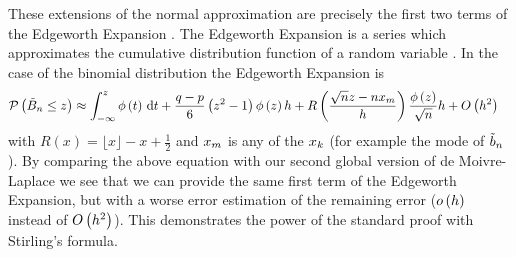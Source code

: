 These extensions of the normal approximation are precisely the first two terms of the Edgeworth Expansion \cite[pp. 39 ff.]{hall}\cite{wiki:edgeworth}. The Edgeworth Expansion is a series which approximates the cumulative distribution function of a random variable \cite{wiki:edgeworth}. In the case of the binomial distribution the Edgeworth Expansion is
\begin{align}
  \P{\BBs \le z} & \approx \int_{-\infty}^z \fphi{t} \d{t} + \frac{q-p}6 \br{z^2-1}\fphi{z} h + R\left(\frac{\sqrt n z - n \x[m]}h\right)\frac{\fphi{z}}{\sqrt n}h + \bigo{h^2}
\end{align}
with $R(x)=\lfloor x \rfloor -x+\frac 12$ and $\x[m]$ is any of the $\x$ (for example the mode of $\bbs$). By comparing the above equation with our second global version of de Moivre-Laplace we see that we can provide the same first term of the Edgeworth Expansion, but with a worse error estimation of the remaining error ($\littleo{h}$ instead of $\bigo{h^2}$). This demonstrates the power of the standard proof with Stirling's formula.

 

